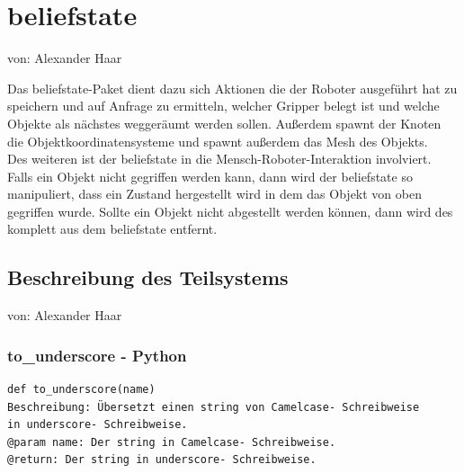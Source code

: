 \documentclass{suturo}
\makeatletter
\newcommand{\chapterauthor}[1]{%
  {\parindent0pt\vspace*{-27pt}%
  \linespread{0}\small\begin{flushright}von: #1\end{flushright}%
  \par\nobreak\vspace*{0pt}}
  \@afterheading%
}
\makeatother
\begin{document}
\section{beliefstate}
\chapterauthor{Alexander Haar}
Das beliefstate-Paket dient dazu sich Aktionen die der Roboter ausgeführt hat zu speichern und auf Anfrage zu ermitteln, welcher Gripper belegt ist und welche Objekte als nächstes weggeräumt werden sollen. Außerdem spawnt der Knoten die Objektkoordinatensysteme und spawnt außerdem das Mesh des Objekts.\\
Des weiteren ist der beliefstate in die Mensch-Roboter-Interaktion involviert. Falls ein Objekt nicht gegriffen werden kann, dann wird der beliefstate so manipuliert, dass ein Zustand hergestellt wird in dem das Objekt von oben gegriffen wurde. Sollte ein Objekt nicht abgestellt werden können, dann wird des komplett aus dem beliefstate entfernt. 

\begin{figure}[!htb]
\end{figure}
      
\subsection{Beschreibung des Teilsystems}
\chapterauthor{Alexander Haar}

\subsubsection{to\_underscore - Python}
\begin{verbatim}
def to_underscore(name)
Beschreibung: Übersetzt einen string von Camelcase- Schreibweise 
in underscore- Schreibweise. 
@param name: Der string in Camelcase- Schreibweise.
@return: Der string in underscore- Schreibweise.
\end{verbatim}
\end{document}
